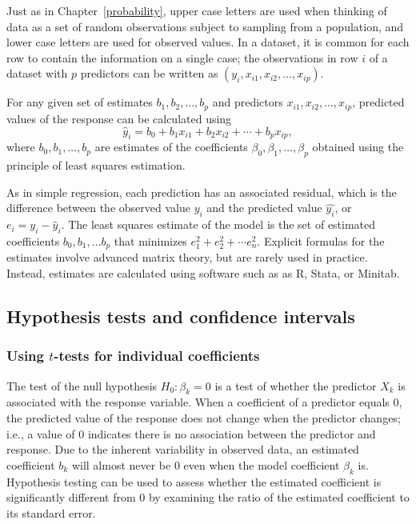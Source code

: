 Just as in Chapter~\ref{probability}, upper case letters are used when thinking of data as a set of random observations subject to sampling from a population, and lower case letters are used for observed values. In a dataset, it is common for each row to contain the information on a single case; the observations in row $i$ of a dataset with $p$ predictors can be written as $(y_i, x_{i1}, x_{i2}, \ldots, x_{ip})$.

For any given set of estimates $b_1, b_2,\ldots,b_p$ and predictors $x_{i1},x_{i2},\ldots,x_{ip}$, predicted values of the response can be calculated using
\[
   \hat{y}_i = b_0 + b_1 x_{i1} + b_2 x_{i2} +\cdots + b_p x_{ip},
\]
where $b_0, b_1, \dots, b_p$ are estimates of the coefficients $\beta_0, \beta_1, \dots, \beta_p$ obtained using the principle of least squares estimation. 

As in simple regression, each prediction has an associated residual, which is the difference between the observed value $y_i$ and the predicted value $\hat{y_i}$, or $e_i = y_i - \hat{y}_i$. The least squares estimate of the model is the set of estimated coefficients $b_0, b_1, \ldots b_p$ that minimizes $e_1^2 + e_2^2 + \cdots e_n^2$. Explicit formulas for the estimates involve advanced matrix theory, but are rarely used in practice.  Instead, estimates are calculated using software such as as \textsf{R}, Stata, or Minitab.

\subsection{Hypothesis tests and confidence intervals}

\subsubsection{Using $t$-tests for individual coefficients}

The test of the null hypothesis $H_0: \beta_k = 0$ is a test of whether the predictor $X_k$ is associated with the response variable. When a coefficient of a predictor equals 0, the predicted value of the response does not change when the predictor changes; i.e., a value of 0 indicates there is no association between the predictor and response. Due to the inherent variability in observed data, an estimated coefficient $b_k$ will almost never be 0 even when the model coefficient $\beta_k$ is. Hypothesis testing can be used to assess whether the estimated coefficient is significantly different from 0 by examining the ratio of the estimated coefficient to its standard error.


